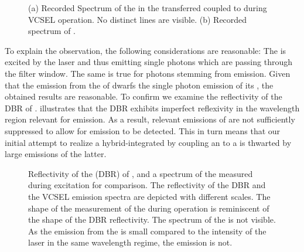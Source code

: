 \begin{figure}[!htb]
\begin{subfigure}[t]{ 0.49\linewidth}
					\caption{}
					\label{subfig::spectrum_vcsel_excitation_without_diamond}
				\end{subfigure}
				\caption[Comparison of spectra between \BmFour and \BmTwo]{(a) Recorded Spectrum of the \siv in the transferred \nd coupled to \BmFour during VCSEL operation. No distinct \siv lines are visible. (b) Recorded spectrum of \BmTwo.}
				\label{fig::vcsel_spectra}
			\end{figure}

		To explain the observation, the following considerations are reasonable: The \siv is excited by the \VCSELs laser and thus emitting single photons which are passing through the filter window. The same is true for photons stemming from \VCSEL \sb emission. Given that the emission from the \sb of \BmFour dwarfs the single photon emission of its \siv, the obtained results are reasonable.
		To confirm we examine the reflectivity of the DBR of \BmFour.  illustrates that the DBR exhibits imperfect reflexivity in the wavelength region relevant for \siv emission. As a result, relevant \sb emissions of \BmFour are not sufficiently suppressed to allow for \siv emission to be detected. This in turn means that our initial attempt to realize a hybrid-integrated \sps by coupling an \siv to a \VCSELs is thwarted by large \sb emissions of the latter.

		\begin{figure}[!htb]
			\centering
			\caption[Reflectivity of \BmFour]{Reflectivity of the \dbr (DBR) of \BmFour \cite{Weidenfeld2012}, and a spectrum of the \siv measured during \VCSEL excitation for comparison. The reflectivity of the DBR and the VCSEL emission spectra are depicted with different scales. The shape of the measurement of the \siv during \VCSEL operation is reminiscent of the shape of the DBR reflectivity. The spectrum of the \siv is not visible. As the emission from the \siv is small compared to the intensity of the laser \sb in the same wavelength regime, the \sivs emission is not.}
			\label{fig::dbr_vcsel}
		\end{figure}

